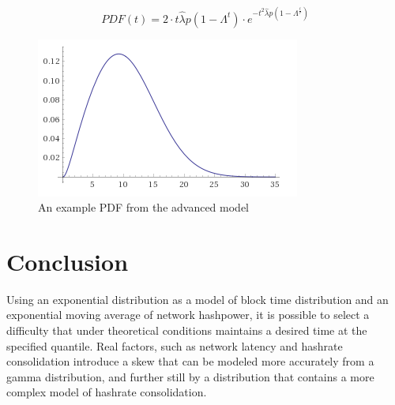 \documentclass[]{article}
\begin{document}
\begin{equation}
PDF(t) = 2 \cdot t\hat{\lambda}p(1 - \Lambda^t) \cdot e^{-t^2\hat{\lambda}p(1 - \Lambda^\frac{t}{\tau})}
\end{equation}

\begin{figure}[h]
	\centering
	\includegraphics[width=0.7\linewidth]{"./bestpdf"}
	\caption{\footnotesize An example PDF from the advanced model \cite{AdvancedDistribution}}
\end{figure}

\pagebreak

\section{Conclusion}
Using an exponential distribution as a model of block time distribution and an exponential moving average of network hashpower, it is possible to select a difficulty that under theoretical conditions maintains a desired time at the specified quantile.  Real factors, such as network latency and hashrate consolidation introduce a skew that can be modeled more accurately from a gamma distribution, and further still by a distribution that contains a more complex model of hashrate consolidation. 



\end{document}
